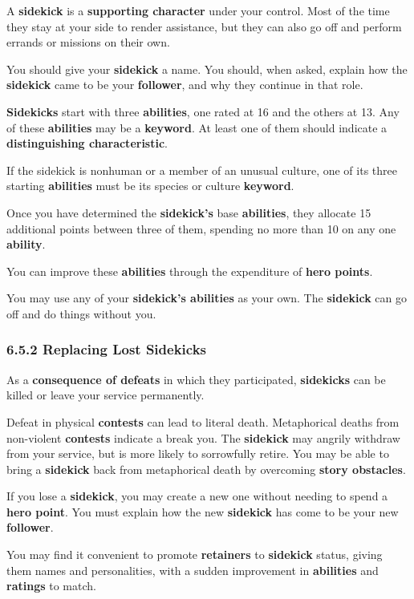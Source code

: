 \documentclass[
]{article}
\begin{document}
A \textbf{sidekick} is a \textbf{supporting character} under your
control. Most of the time they stay at your side to render assistance,
but they can also go off and perform errands or missions on their own.

You should give your \textbf{sidekick} a name. You should, when asked,
explain how the \textbf{sidekick} came to be your \textbf{follower}, and
why they continue in that role.

\textbf{Sidekicks} start with three \textbf{abilities}, one rated at 16
and the others at 13. Any of these \textbf{abilities} may be a
\textbf{keyword}. At least one of them should indicate a
\textbf{distinguishing characteristic}.

If the sidekick is nonhuman or a member of an unusual culture, one of
its three starting \textbf{abilities} must be its species or culture
\textbf{keyword}.

Once you have determined the \textbf{sidekick's} base
\textbf{abilities}, they allocate 15 additional points between three of
them, spending no more than 10 on any one \textbf{ability}.

You can improve these \textbf{abilities} through the expenditure of
\textbf{hero points}.

You may use any of your \textbf{sidekick's abilities} as your own. The
\textbf{sidekick} can go off and do things without you.

\hypertarget{replacing-lost-sidekicks}{%
\subsubsection{6.5.2 Replacing Lost
Sidekicks}\label{replacing-lost-sidekicks}}

As a \textbf{consequence of defeats} in which they participated,
\textbf{sidekicks} can be killed or leave your service permanently.

Defeat in physical \textbf{contests} can lead to literal death.
Metaphorical deaths from non-violent \textbf{contests} indicate a break
you. The \textbf{sidekick} may angrily withdraw from your service, but
is more likely to sorrowfully retire. You may be able to bring a
\textbf{sidekick} back from metaphorical death by overcoming
\textbf{story obstacles}.

If you lose a \textbf{sidekick}, you may create a new one without
needing to spend a \textbf{hero point}. You must explain how the new
\textbf{sidekick} has come to be your new \textbf{follower}.

You may find it convenient to promote \textbf{retainers} to
\textbf{sidekick} status, giving them names and personalities, with a
sudden improvement in \textbf{abilities} and \textbf{ratings} to match.
\end{document}
